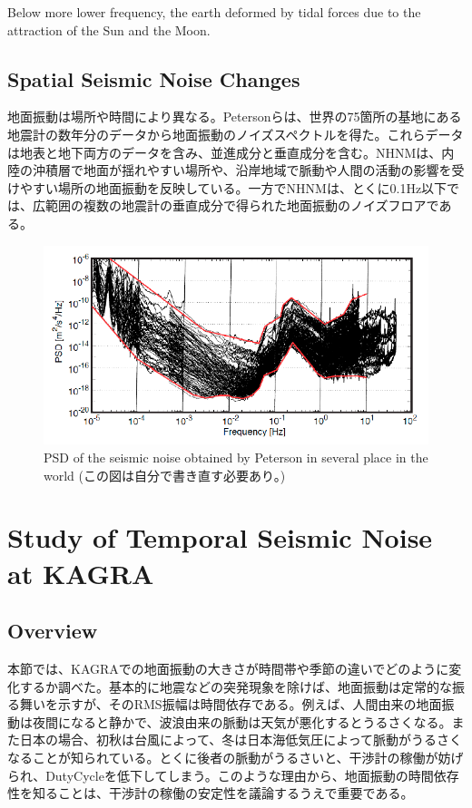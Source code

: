 Below more lower frequency, the earth deformed by tidal forces due to the attraction of the Sun and the Moon. 

\subsection{Spatial Seismic Noise Changes}
地面振動は場所や時間により異なる。Petersonらは、世界の75箇所の基地にある地震計の数年分のデータから地面振動のノイズスペクトルを得た。これらデータは地表と地下両方のデータを含み、並進成分と垂直成分を含む。NHNMは、内陸の沖積層で地面が揺れやすい場所や、沿岸地域で脈動や人間の活動の影響を受けやすい場所の地面振動を反映している。一方でNHNMは、とくに0.1Hz以下では、広範囲の複数の地震計の垂直成分で得られた地面振動のノイズフロアである。


\begin{figure}[h]
  \begin{center}   
    \includegraphics[width=12.5cm]{./img_chap3/img324.png}
    \caption{PSD of the seismic noise obtained by Peterson in several place in the world\cite{peterson1993observations} (この図は自分で書き直す必要あり。)}\label{img:img324}
  \end{center}
\end{figure}


\newpage
\section{Study of Temporal Seismic Noise at KAGRA}
\subsection{Overview}
本節では、KAGRAでの地面振動の大きさが時間帯や季節の違いでどのように変化するか調べた。基本的に地震などの突発現象を除けば、地面振動は定常的な振る舞いを示すが、そのRMS振幅は時間依存である。例えば、人間由来の地面振動は夜間になると静かで、波浪由来の脈動は天気が悪化するとうるさくなる。また日本の場合、初秋は台風によって、冬は日本海低気圧によって脈動がうるさくなることが知られている\cite{}。とくに後者の脈動がうるさいと、干渉計の稼働が妨げられ、DutyCycleを低下してしまう。このような理由から、地面振動の時間依存性を知ることは、干渉計の稼働の安定性を議論するうえで重要である。


